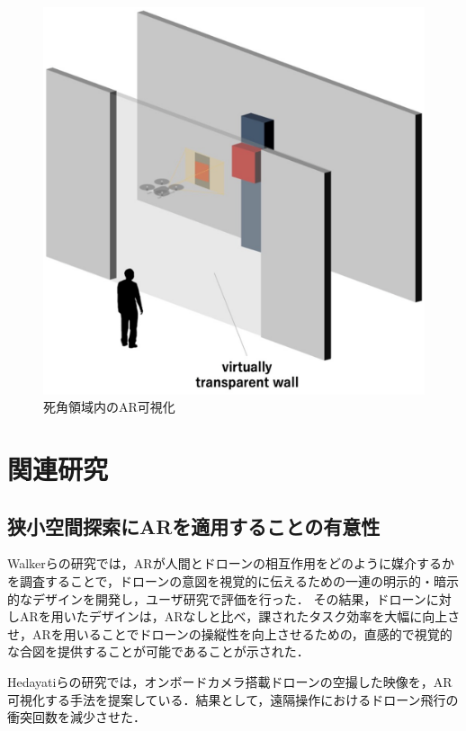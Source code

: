 \documentclass[submit,techrep]{ipsj}
\begin{document}
\begin{figure}[tb]
\centering
\includegraphics[width=\linewidth]{img/02_relation.eps}
\caption{死角領域内のAR可視化}
\label{fig:02_relation}
\end{figure}


\section{関連研究}
\subsection{狭小空間探索にARを適用することの有意性}
Walkerらの研究\cite{Walker}では，ARが人間とドローンの相互作用をどのように媒介するかを調査することで，ドローンの意図を視覚的に伝えるための一連の明示的・暗示的なデザインを開発し，ユーザ研究で評価を行った．
その結果，ドローンに対しARを用いたデザインは，ARなしと比べ，課されたタスク効率を大幅に向上させ，ARを用いることでドローンの操縦性を向上させるための，直感的で視覚的な合図を提供することが可能であることが示された．

Hedayatiらの研究\cite{Hedayati}では，オンボードカメラ搭載ドローンの空撮した映像を，AR可視化する手法を提案している．結果として，遠隔操作におけるドローン飛行の衝突回数を減少させた．
\end{document}
